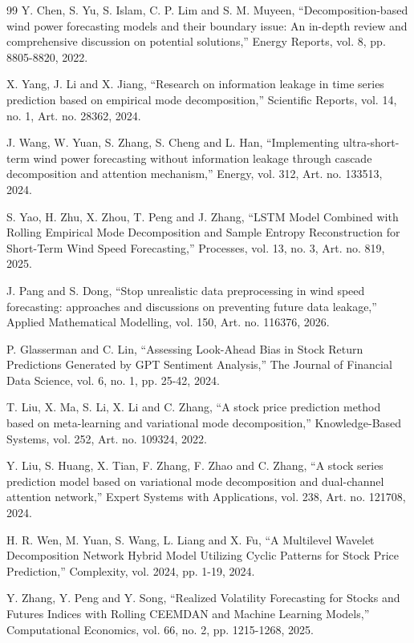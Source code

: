 \documentclass[pdflatex,sn-mathphys-num]{sn-jnl}%
\theoremstyle{thmstyleone}%
\theoremstyle{thmstyletwo}%
\theoremstyle{thmstylethree}%
\begin{document}
\begin{thebibliography}{99}
 Y. Chen, S. Yu, S. Islam, C. P. Lim and S. M. Muyeen, ``Decomposition-based wind power
forecasting models and their boundary issue: An in-depth review and comprehensive
discussion on potential solutions,'' Energy Reports, vol. 8, pp. 8805-8820, 2022.

 X. Yang, J. Li and X. Jiang, ``Research on information leakage in time series
prediction based on empirical mode decomposition,'' Scientific Reports, vol. 14, no.
1, Art. no. 28362, 2024.

 J. Wang, W. Yuan, S. Zhang, S. Cheng and L. Han, ``Implementing ultra-short-term wind
power forecasting without information leakage through cascade decomposition and
attention mechanism,'' Energy, vol. 312, Art. no. 133513, 2024.

 S. Yao, H. Zhu, X. Zhou, T. Peng and J. Zhang, ``LSTM Model Combined with Rolling
Empirical Mode Decomposition and Sample Entropy Reconstruction for Short-Term Wind
Speed Forecasting,'' Processes, vol. 13, no. 3, Art. no. 819, 2025.

 J. Pang and S. Dong, ``Stop unrealistic data preprocessing in wind speed forecasting:
approaches and discussions on preventing future data leakage,'' Applied Mathematical
Modelling, vol. 150, Art. no. 116376, 2026.

 P. Glasserman and C. Lin, ``Assessing Look-Ahead Bias in Stock Return Predictions
Generated by GPT Sentiment Analysis,'' The Journal of Financial Data Science, vol. 6,
no. 1, pp. 25-42, 2024.

 T. Liu, X. Ma, S. Li, X. Li and C. Zhang, ``A stock price prediction method based on
meta-learning and variational mode decomposition,'' Knowledge-Based Systems, vol. 252,
Art. no. 109324, 2022.

 Y. Liu, S. Huang, X. Tian, F. Zhang, F. Zhao and C. Zhang, ``A stock series prediction
model based on variational mode decomposition and dual-channel attention network,''
Expert Systems with Applications, vol. 238, Art. no. 121708, 2024.

 H. R. Wen, M. Yuan, S. Wang, L. Liang and X. Fu, ``A Multilevel Wavelet Decomposition
Network Hybrid Model Utilizing Cyclic Patterns for Stock Price Prediction,''
Complexity, vol. 2024, pp. 1-19, 2024.

 Y. Zhang, Y. Peng and Y. Song, ``Realized Volatility Forecasting for Stocks and
Futures Indices with Rolling CEEMDAN and Machine Learning Models,'' Computational
Economics, vol. 66, no. 2, pp. 1215-1268, 2025.


\end{thebibliography}
\end{document}
